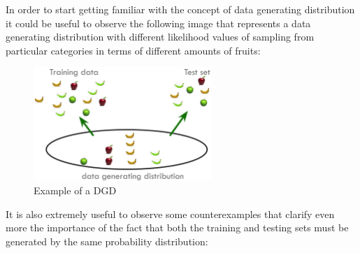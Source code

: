 In order to start getting familiar with the concept of data generating
distribution it could be useful to observe the following image that
represents a data generating distribution with different likelihood
values of sampling from particular categories in terms of different
amounts of fruits:

\newpage

\begin{figure}[h]
      \centering
      \includegraphics[width=0.6\textwidth]{../img/DGD_example}
      \caption{Example of a DGD}
\end{figure}

\vspace{5mm}

It is also extremely useful to observe some counterexamples that
clarify even more the importance of the fact that both the training
and testing sets must be generated by the same probability distribution:

\vspace{5mm}

